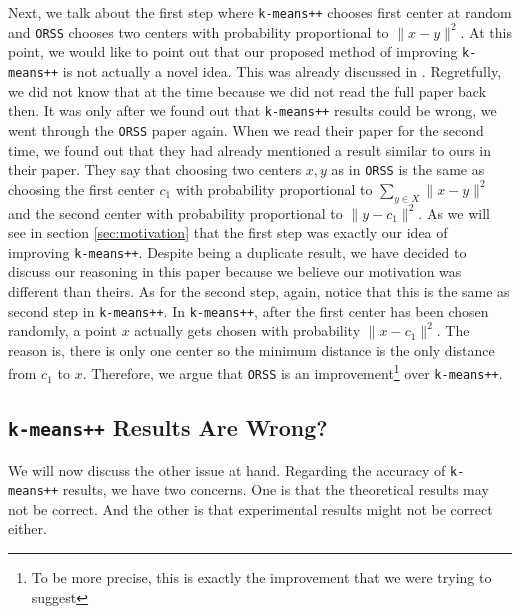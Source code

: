 \documentclass[twoside, 11pt]{article}
\begin{document}
	Next, we talk about the first step where \texttt{k-means++} chooses first center at random and \texttt{ORSS} chooses two centers with probability proportional to $\|x-y\|^2$. At this point, we would like to point out that our proposed method of improving \texttt{k-means++} is not actually a novel idea. This was already discussed in \citet{ostrovsky}. Regretfully, we did not know that at the time because we did not read the full paper back then. It was only after we found out that \texttt{k-means++} results could be wrong, we went through the \texttt{ORSS} paper again. When we read their paper for the second time, we found out that they had already mentioned a result \cite[Page 4, section 3, Paragraph: Running Time]{ostrovsky} similar to ours in their paper. They say that choosing two centers $x,y$ as in \texttt{ORSS} is the same as choosing the first center $c_1$ with probability proportional to $\sum_{y\in X}\|x-y\|^2$ and the second center with probability proportional to $\|y-c_1\|^2$. As we will see in section \ref{sec:motivation} that the first step was exactly our idea of improving \texttt{k-means++}. Despite being a duplicate result, we have decided to discuss our reasoning in this paper because we believe our motivation was different than theirs. As for the second step, again, notice that this is the same as second step in \texttt{k-means++}. In \texttt{k-means++}, after the first center has been chosen randomly, a point $x$ actually gets chosen with probability $\|x-c_1\|^2$. The reason is, there is only one center so the minimum distance is the only distance from $c_1$ to $x$. Therefore, we argue that \texttt{ORSS} is an improvement\footnote{To be more precise, this is exactly the improvement that we were trying to suggest} over \texttt{k-means++}.
	\subsection{\texttt{k-means++} Results Are Wrong?}
	We will now discuss the other issue at hand. Regarding the accuracy of \texttt{k-means++} results, we have two concerns. One is that the theoretical results may not be correct. And the other is that experimental results might not be correct either.
	
\end{document}
